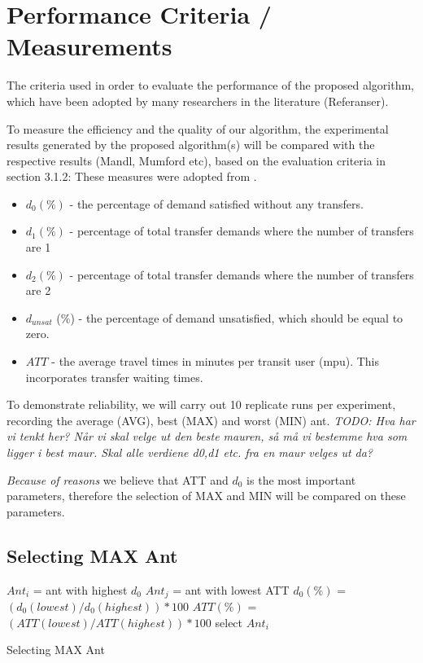\section{Performance Criteria / Measurements}


The criteria used in order to evaluate the performance of the proposed algorithm, which have been adopted by many researchers in the literature (Referanser).

To measure the efficiency and the quality of our algorithm, the experimental results generated by the proposed algorithm(s) will be compared with the respective results (Mandl, Mumford etc), based on the evaluation criteria in section 3.1.2: 
These measures were adopted from \citet{kechagiopoulos14}.

\begin{itemize}
\item $d_0 (\%)$ - the percentage of demand satisfied without any transfers.
\item $d_1 (\%)$ - percentage of total transfer demands where the number of transfers are 1
\item $d_2 (\%)$ - percentage of total transfer demands where the number of transfers are 2
\item $d_{unsat}$ (\%) - the percentage of demand unsatisfied, which should be equal to zero.
\item $ATT$  - the average travel times in minutes per transit user (mpu). This incorporates transfer waiting times. 
\end{itemize}

To demonstrate reliability, we will carry out 10 replicate runs per experiment, recording the average (AVG), best (MAX) and worst (MIN) ant.  
\emph{\color{red} TODO: Hva har vi tenkt her? Når vi skal velge ut den beste mauren, så må vi bestemme hva som ligger i best maur. Skal alle verdiene d0,d1 etc. fra en maur velges ut da?}

\emph{\color{red} Because of reasons }we believe that ATT and $d_0$ is the most important parameters, therefore the selection of MAX and MIN will be compared on these parameters.

\subsection{Selecting MAX Ant}

\begin{algorithm}[H]
$Ant_{i}$ = ant with highest $d_0$\;
$Ant_{j}$ = ant with lowest ATT\;
{
	$d_0(\%)$ = $(d_0(lowest) / d_0(highest))*100$\;
	$ATT(\%)$ = $(ATT(lowest) / ATT(highest))*100$\;
	{
		select $Ant_{i}$
	}
}
 \caption{Selecting MAX Ant}
\end{algorithm}


